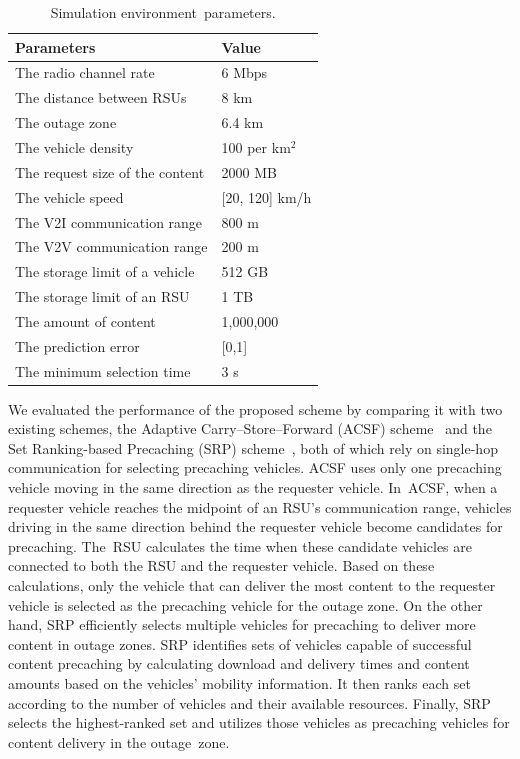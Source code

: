 \documentclass[electronics,aricle,accept,pdftex,moreauthors]{Definitions/mdpi}
\begin{document}
\begin{table}[H] %
    \caption{Simulation environment~parameters.}
    
    \begin{tabularx}{\textwidth}{LL}
        \toprule
        \textbf{Parameters} & \textbf{Value} \\
        \midrule 
        The radio channel rate & 6 Mbps\\
        The distance between RSUs & 8 km\\
        The outage zone & 6.4 km\\
        The vehicle density & 100 per {km}$^{2}$\\
        The request size of the content & 2000 MB\\
        The vehicle speed & [20, 120] km/h\\
        The V2I communication range & 800 m\\
        The V2V communication range & 200 m\\
        
        The storage limit of a vehicle & 512 GB\\
        The storage limit of an RSU & 1 TB\\
        The amount of content & 1,000,000\\
        
        The prediction error & [0,1]\\
        The minimum selection time & 3 s\\
        \bottomrule
    \end{tabularx}
    \label{table2}
\end{table}




We evaluated the performance of the proposed scheme by comparing it with two existing schemes, the Adaptive Carry--Store--Forward (ACSF) scheme~\cite{Wu2013} and the Set Ranking-based Precaching (SRP) scheme~\cite{Nam2023}, both of which rely on single-hop communication for selecting precaching vehicles.
ACSF uses only one precaching vehicle moving in the same direction as the requester vehicle. In~ACSF, when a requester vehicle reaches the midpoint of an RSU’s communication range, vehicles driving in the same direction behind the requester vehicle become candidates for precaching. The~RSU calculates the time when these candidate vehicles are connected to both the RSU and the requester vehicle. Based on these calculations, only the vehicle that can deliver the most content to the requester vehicle is selected as the precaching vehicle for the outage zone.
On the other hand, SRP efficiently selects multiple vehicles for precaching to deliver more content in outage zones. SRP identifies sets of vehicles capable of successful content precaching by calculating download and delivery times and content amounts based on the vehicles' mobility information. It then ranks each set according to the number of vehicles and their available resources. Finally, SRP selects the highest-ranked set and utilizes those vehicles as precaching vehicles for content delivery in the outage~zone.
\end{document}
